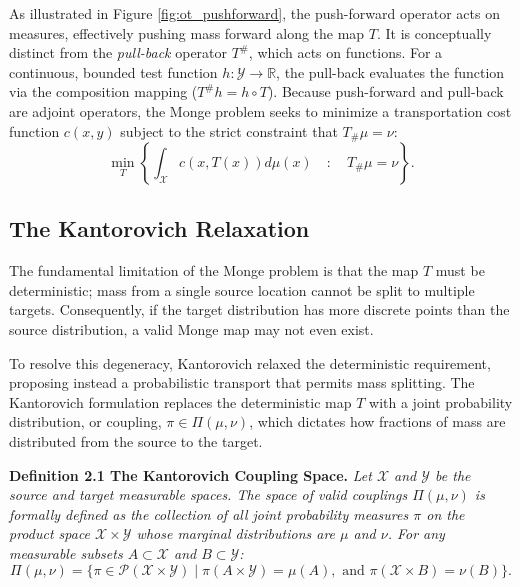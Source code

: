 \documentclass[12pt,a4paper,twoside,openany]{book}
\begin{document}
As illustrated in Figure \ref{fig:ot_pushforward}, the push-forward operator acts on measures, effectively 
pushing mass forward along the map $T$. It is conceptually distinct from the \textit{pull-back} operator $T^{\#}$, which acts on functions. 
For a continuous, bounded test function $h: \mathcal{Y} \rightarrow \mathbb{R}$, the pull-back evaluates the function via 
the composition mapping ($T^{\#} h = h \circ T$). Because push-forward and pull-back are adjoint operators, 
the Monge problem seeks to minimize a transportation cost function $c(x,y)$ subject to the strict constraint that $T_{\#}\mu = \nu$:
\begin{equation}
    \min_{T} \left\{ \int_{\mathcal{X}} c(x, T(x)) d\mu(x) \quad : \quad T_{\#}\mu = \nu \right\}.
\end{equation}

\subsection{The Kantorovich Relaxation}
The fundamental limitation of the Monge problem is that the map $T$ must be deterministic; mass from 
a single source location cannot be split to multiple targets. Consequently, if the target distribution has more 
discrete points than the source distribution, a valid Monge map may not even exist. 

To resolve this degeneracy, Kantorovich \citeyear{kantorovich1942} relaxed the deterministic requirement, 
proposing instead a probabilistic transport that permits mass splitting. 
The Kantorovich formulation replaces the deterministic map $T$ with a joint probability distribution, 
or coupling, $\pi \in \Pi(\mu, \nu)$, which dictates how fractions of mass are distributed from the source to the target.

\vspace{0.5em}
\noindent\textbf{Definition 2.1 The Kantorovich Coupling Space.} \textit{Let $\mathcal{X}$ and $\mathcal{Y}$ be the source and target measurable spaces. 
The space of valid couplings $\Pi(\mu, \nu)$ is formally defined as the collection of all joint probability measures $\pi$ on the product 
space $\mathcal{X} \times \mathcal{Y}$ whose marginal distributions are $\mu$ and $\nu$. For any measurable 
subsets $A \subset \mathcal{X}$ and $B \subset \mathcal{Y}$:}
\begin{equation}
    \Pi(\mu, \nu) = \big\{ \pi \in \mathcal{P}(\mathcal{X} \times \mathcal{Y}) \mid \pi(A \times \mathcal{Y}) = \mu(A), \text{ and } \pi(\mathcal{X} \times B) = \nu(B) \big\}.
\end{equation}
\vspace{0.5em}
\end{document}
